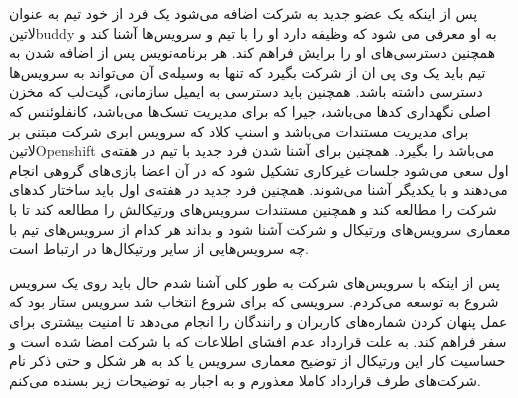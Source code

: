 \documentclass[a4]{report}
\begin{document}
پس از اینکه یک عضو جدید به شرکت اضافه می‌شود یک فرد از خود تیم به عنوان ‌لاتین{buddy} به او معرفی می شود
که وظیفه دارد او را با تیم و سرویس‌ها آشنا کند و همچنین دسترسی‌های او را برایش فراهم کند.
هر برنامه‌نویس پس از اضافه شدن به تیم باید یک وی پی ان از شرکت بگیرد که تنها به وسیله‌ی آن می‌تواند به سرویس‌ها دسترسی داشته باشد.
همچنین باید دسترسی به ایمیل سازمانی، گیت‌لب که مخزن اصلی نگهداری کدها می‌باشد،
جیرا که برای مدیریت تسک‌ها می‌باشد،
کانفلوئنس که برای مدیریت مستندات می‌باشد
و اسنپ کلاد که سرویس ابری شرکت مبتنی بر ‌لاتین{Openshift} می‌باشد
را بگیرد.
همچنین برای آشنا شدن فرد جدید با تیم در هفته‌ی اول سعی می‌شود جلسات غیرکاری تشکیل شود که در آن اعضا بازی‌های گروهی انجام می‌دهند
و با یکدیگر آشنا می‌شوند.
همچنین فرد جدید در هفته‌ی اول باید ساختار کد‌های شرکت را مطالعه کند
و همچنین مستندات سرویس‌های ورتیکالش را مطالعه کند
تا با معماری سرویس‌های ورتیکال و شرکت آشنا شود
و بداند هر کدام از سرویس‌های تیم با چه سرویس‌هایی از سایر ورتیکال‌ها در ارتباط است.


پس از اینکه با سرویس‌های شرکت به طور کلی آشنا شدم حال باید روی یک سرویس شروع به توسعه می‌کردم.
سرویسی که برای شروع انتخاب شد سرویس ستار بود که عمل پنهان کردن شماره‌های کاربران و رانندگان را انجام می‌دهد تا امنیت بیشتری برای سفر فراهم کند.
به علت قرارداد عدم افشای اطلاعات که با شرکت امضا شده است و حساسیت کار این ورتیکال از توضیح معماری سرویس یا کد به هر شکل و حتی ذکر نام شرکت‌های
طرف قرارداد کاملا معذورم و به اجبار به توضیحات زیر بسنده می‌کنم.
\end{document}
